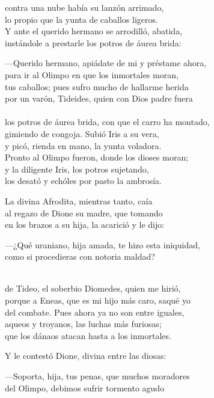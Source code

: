 contra una nube había su lanzón arrimado,\\
lo propio que la yunta de caballos ligeros.\\
Y ante el querido hermano se arrodilló, abatida,\\
instándole a prestarle los potros de áurea brida:\par
---Querido hermano, apiádate de mi y préstame ahora,\\
para ir al Olimpo en que los inmortales moran,\\
tus caballos; pues sufro mucho de hallarme herida\\
por un varón, Tideides, quien con Dios padre fuera\\
\\
los potros de áurea brida, con que el carro ha montado,\\
gimiendo de congoja. Subió Iris a su vera,\\
y picó, rienda en mano, la yunta voladora.\\
Pronto al Olimpo fueron, donde los dioses moran;\\
y la diligente Iris, los potros sujetando,\\
los desató y echóles por pasto la ambrosía.\par
La divina Afrodita, mientras tanto, caía\\
al regazo de Dione su madre, que tomando\\
en los brazos a su hija, la acarició y le dijo:\par
---¿Qué uraniano, hija amada, te hizo esta iniquidad,\\
como si procedieras con notoria maldad?\par
{}\\
de Tideo, el soberbio Diomedes, quien me hirió,\\
porque a Eneas, que es mi hijo más caro, saqué yo\\
del combate. Pues ahora ya no son entre iguales,\\
aqueos y troyanos, las luchas más furiosas;\\
que los dánaos atacan hasta a los inmortales.\par
Y le contestó Dione, divina entre las diosas:\par
---Soporta, hija, tus penas, que muchos moradores\\
del Olimpo, debimos sufrir tormento agudo\\
